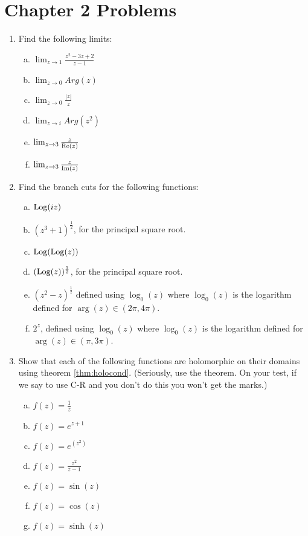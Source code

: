 \section*{Chapter 2 Problems}

\begin{enumerate}
\item Find the following limits:

\begin{enumerate}[a)]
\item $\lim_{z \rightarrow 1} \frac{z^2 - 3z + 2}{z - 1}$
\item $\lim_{z \rightarrow 0} Arg(z)$
\item $\lim_{z \rightarrow 0} \frac{|z|}{z}$
\item $\lim_{z \rightarrow i} Arg(z^2) $
\item $\lim_{z \rightarrow 3} \frac{z}{\operatorname{Re}(z)} $
\item $\lim_{z \rightarrow 3} \frac{z}{\operatorname{Im}(z)} $
\end{enumerate}

\item Find the branch cuts for the following functions:

\begin{enumerate}[a)]
\item $\mathrm{Log}(iz)$
\item $(z^3 + 1)^{\frac{1}{2}}$, for the principal square root.
\item $\mathrm{Log}(\mathrm{Log}(z))$
\item $(\mathrm{Log}(z))^\frac{1}{2}$, for the principal square root.
\item $(z^2 - z)^{\frac{1}{2}}$ defined using $\log_0(z)$ where $\log_0(z)$ is the logarithm defined for $\arg(z)\in (2\pi, 4\pi)$. 
\item $2^z$, defined using $\log_0(z)$ where $\log_0(z)$ is the logarithm defined for $\arg(z)\in (\pi, 3\pi)$. 
\end{enumerate}


\item Show that each of the following functions are holomorphic on their domains using theorem \ref{thm:holocond}. (Seriously, use the theorem. On your test, if we say to use C-R and you don't do this you won't get the marks.)

\begin{enumerate}[a)]
\item $f(z) = \frac{1}{z}$
\item $f(z) = e^{z + 1}$
\item $f(z) = e^{(z^2)}$
\item $f(z) = \frac{z^2}{z-1}$
\item $f(z) = \sin(z)$
\item $f(z) = \cos(z)$
\item $f(z) = \sinh(z)$
\end{enumerate} 


\end{enumerate}
